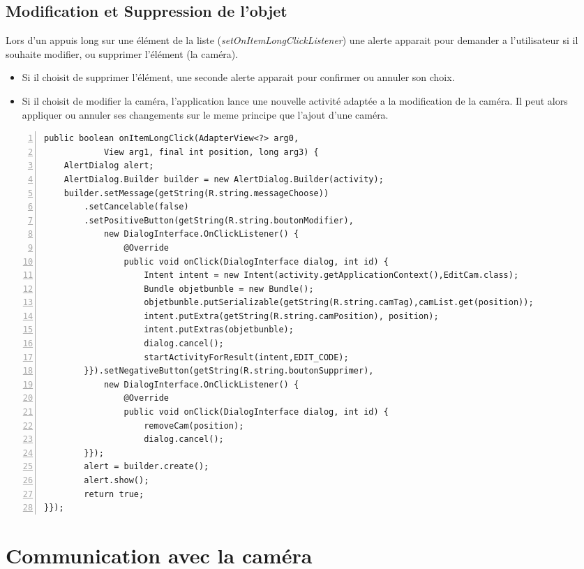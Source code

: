 \subsection{Modification et Suppression de l'objet}
Lors d'un appuis long sur une élément de la liste
(\textit{setOnItemLongClickListener}) une alerte apparait pour demander a
l'utilisateur si il souhaite modifier, ou supprimer l'élément (la caméra).
\begin{itemize}
  \item Si il choisit de supprimer l'élément, une seconde alerte apparait pour confirmer
ou annuler son choix. 
\item Si il choisit de modifier la caméra, l'application lance une nouvelle
activité adaptée a la modification de la caméra. Il peut alors appliquer ou
annuler ses changements sur le meme principe que l'ajout d'une caméra.
\end{itemize}
\newpage
\begin{changemargin}{-1cm}{-1.5cm}
\begin{lstlisting}[caption={Gestion d'un appui long sur un élément de la
liste.}, framexleftmargin=7mm, numbers=left]
public boolean onItemLongClick(AdapterView<?> arg0, 
			View arg1, final int position, long arg3) { 
	AlertDialog alert; 
	AlertDialog.Builder builder = new AlertDialog.Builder(activity);
	builder.setMessage(getString(R.string.messageChoose))
		.setCancelable(false)
		.setPositiveButton(getString(R.string.boutonModifier),
			new DialogInterface.OnClickListener() {
				@Override
				public void onClick(DialogInterface dialog, int id) {
					Intent intent = new Intent(activity.getApplicationContext(),EditCam.class); 
					Bundle objetbunble = new Bundle();
					objetbunble.putSerializable(getString(R.string.camTag),camList.get(position));
					intent.putExtra(getString(R.string.camPosition), position);
					intent.putExtras(objetbunble);
					dialog.cancel();
					startActivityForResult(intent,EDIT_CODE);
		}}).setNegativeButton(getString(R.string.boutonSupprimer),
			new DialogInterface.OnClickListener() {
				@Override
				public void onClick(DialogInterface dialog, int id) {
					removeCam(position);
					dialog.cancel();
		}});
		alert = builder.create();
		alert.show();
		return true;
}});
\end{lstlisting}
\end{changemargin}


\section{Communication avec la caméra}


